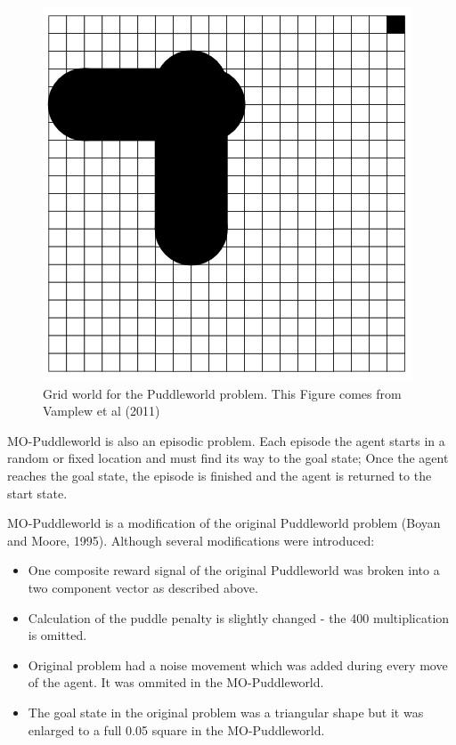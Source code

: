 {{\begin{figure}[ht]
\vskip 0.2in
\centering
\includegraphics[scale=0.9]{pw.png}
\caption{Grid world for the Puddleworld problem. This Figure comes from Vamplew et al (2011)}
\label{fig:PWOverview}
\end{figure}

MO-Puddleworld is also an episodic problem. Each episode the agent starts in a random or fixed location and must find its way to the goal state; Once the agent reaches the goal state, the episode is finished and the agent is returned to the start state.

MO-Puddleworld is a modification of the original Puddleworld problem (Boyan and Moore, 1995\nocite{boyan1995generalization}). Although several modifications were introduced:

\begin{itemize}
  \item One composite reward signal of the original Puddleworld was broken into a two component vector as described above.
  \item Calculation of the puddle penalty is slightly changed - the 400 multiplication is omitted.
  \item Original problem had a noise movement which was added during every move of the agent. It was ommited in the MO-Puddleworld.
  \item The goal state in the original problem was a triangular shape but it was enlarged to a full 0.05 square in the MO-Puddleworld.
\end{itemize}

}}

